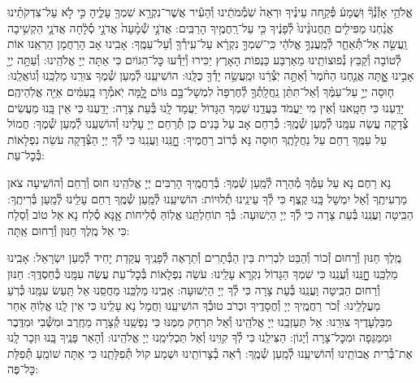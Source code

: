 \documentclass[twoside, openany, parskip=half, 11pt]{book}
\begin{document}
אֱלֹהַ֥י אָזְ֯נְ֯ךָ֘ וּֽשֲׁמָע֒ פְּ֯קַ֣חה עֵינֶ֗יךָ וּרְאֵה֙ שֹֽׁמְ֯מֹתֵ֔ינוּ וְ֯הָעִ֕יר אֲשֶׁר־נִקְרָ֥א שִׁמְךָ֖ עָלֶ֑יהָ כִּ֣י לֹ֣א עַל־צִדְקֹתֵ֗ינוּ אֲנַ֨חְנוּ מַפִּילִ֤ים תַּֽחֲנוּנֵ֨ינוּ֙ לְ֯פָנֶ֔יךָ כִּ֖י עַל־רַֽחֲמֶ֥יךָ הָרַבִּֽים: אֲדֹנָ֤י שְׁ֯מָ֨עָה֙ אֲדֹנָ֣י סְ֯לָ֔חָה אֲדֹנָ֛י הַקְשִׁ֥יבָה וַֽעֲשֵׂ֖ה אַל־תְּ֯אַחַ֑ר לְ֯מַֽעֲנְךָ֣ אֱלֹהַ֔י כִּֽי־שִׁמְךָ֣ נִקְרָ֔א עַל־עִֽירְ֯ךָ֖ וְ֯עַל־עַמֶּֽךָ: אָבִֽינוּ אָב הָרַחֲמָן הַרְאֵֽנוּ אוֹת לְ֯טוֹבָה וְ֯קַבֵּץ נְ֯פוּצוֹתֵֽינוּ מֵאַרְבַּע כַּנְפוֹת הָאָרֶץ יַכִּירוּ וְ֯יֵדְ֯עוּ כׇּל־הַגּוֹיִם כִּי אַתָּה יְיָ אֱלֹהֵֽינוּ:
וְ֯עַתָּ֥ה יְיָ֖ אָבִ֣ינוּ אׇׇׇֽתָּה אֲנַ֤חְנוּ הַחֹ֨מֶר֙ וְ֯אַתָּ֣ה יֹֽצְ֯רֵ֔נוּ וּמַֽעֲשֵׂ֥ה יָדְ֯ךָ֖ כֻּלָּֽנוּ: הוֹשִׁיעֵֽנוּ לְ֯מַעַן שְׁ֯מֶךָ צוּרֵֽנוּ מַלְכֵּֽנוּ וְ֯גוֹאֲלֵֽנוּ:
ח֧וּסָה יְיָ֣ עַל־עַמֶּ֗ךָ וְ֯אַל־תִּתֵּ֨ן נַֽחֲלָֽתְ֯ךָ֤ לְ֯חֶרְפָּה֙ לִמְשָׁל־בָּ֣ם גּוֹיִ֔ם לׇׇ֚מָּה יֹֽאמְ֯ר֣וּ בָֽעַמִּ֔ים אַיֵּ֖ה אֱלֹֽהֵיהֶֽם׃ יָדַֽעְנוּ כִּי חָטָֽאנוּ וְ֯אֵין מִי יַעֲמֹד בַּעֲדֵֽנוּ שִׁמְךָ הַגָּדוֹל יַעֲמָד לָֽנוּ בְּ֯עֵת צָרָה: יָדַֽעְנוּ כִּי אֵין בָּֽנוּ מַעֲשִׂים צְ֯דָקָה עֲשֵׂה עִמָּֽנוּ לְ֯מַעַן שְׁ֯מֶֽךָ: כְּ֯רַחֵם אָב עַל בָּנִים כֵּן תְּ֯רַחֵם יְיָ עָלֵינוּ וְ֯הוֹשִׁעֵֽנוּ לְ֯מַעַן שְׁ֯מֶךָ: חֲמוֹל עַל עַמֶּֽךָ רַחֵם עַל נַחֲלָתֶֽךָ חֽוּסָה נָּא כְּ֯רוֹב רַחֲמֶיךָ: חׇׇׇׇנֵּֽנוּ וַעֲנֵֽנוּ כִּי לְ֯ךָ יְיָ הַצְּ֯דָקָה עֹשֵׂה נִפְלָאוֹת בְּ֯כׇל־עֵת:



נָא רַחֶם נָא עַל עַמְּ֯ךָ מְ֯הֵרָה לְ֯מַֽעַן שְׁ֯מֶךָ: בְּ֯רַחֲמֶֽיךָ הָרַבִּים יְיָ אֱלֹהֵֽינוּ חוּס וְ֯רַחֵם וְ֯הוֹשִֽׁיעָה צֹאן מַרְעִיתֶֽךָ וְ֯אַל יִמְשָׁל בָּֽנוּ קֶֽצֶף כִּי לְ֯ךָ עֵינֵֽינוּ תְ֯לוּיוֹת: הוֹשִׁיעֵֽנוּ לְ֯מַֽעַן שְׁ֯מֶֽךָ רַחֵם עָלֵֽינוּ לְ֯מַֽעַן בְּ֯רִיתֶֽךָ: הַבִּֽיטָה וַעֲנֵֽנוּ בְּ֯עֵת צָרָה כִּי לְ֯ךָ יְיָ הַיְשׁוּעָה: בְּ֯ךָ תוֹחַלְתֵּֽנוּ אֱלֽוֹהַּ סְ֯לִיחוֹת אׇׇנָּא סְ֯לַח נָא אֵל טוֹב וְ֯סַלָח כִּי אֵל מֶֽלֶךְ חַנּוּן וְ֯רַחוּם אַֽתָּה:

מֶֽלֶךְ חַנּוּן וְ֯רַחוּם זְ֯כוֹר וְ֯הַבֵּט לִבְרִית בֵּין הַבְּ֯תָרִים וְ֯תֵרָאֶה לְ֯פָנֶֽיךָ עֲקֵדַת יָחִיד לְ֯מַעַן יִשְׂרָאֵל: אָבִֽינוּ מַלְכֵּֽנוּ חׇׇׇׇנֵּֽנוּ וְ֯עֲנֵֽנוּ כִּי שִׁמְךָ הַגָּדוֹל נִקְרָא עָלֵֽינוּ: עֹשֵׂה נִפְלָאוֹת בְּ֯כׇל־עֵת עֲשֵׂה עִמָּֽנוּ כְּ֯חַסְדֶּֽךָ: חַנּוּן וְ֯רַחוּם הַבִּֽיטָה וַעֲנֵֽנוּ בְּ֯עֵת צָרָה כִּי לְ֯ךָ יְיָ הַיְשׁוּעָה: אָבִֽינוּ מַלְכֵּֽנוּ מַחֲסֵֽנוּ אַל תַּֽעַשׂ עִמָּֽנוּ כְּ֯רֹֽעַ מַעֲלָלֵֽינוּ: זְ֯כֹר רַחֲמֶֽיךָ יְיָ וְ֯חֲסָדֶֽיךָ וּכְרֹב טוּבְ֯ךָ הוֹשִׁיעֵֽנוּ וַחֲמָל נָא עָלֵֽינוּ כִּי אֵין לָֽנוּ אֱלֽוֹהַּ אַחֵר מִבַּלְעָדֶיךָ צוּרֵֽנוּ: אַל תַּעַזְבֵֽנוּ יְיָ אֱלֹהֵֽינוּ וְ֯אַל תִּרְחַק מִמֶּנּוּ כִּי נַפְשֵֽׁנוּ קְ֯צָרָה מֵחֶֽרֶב וּמִשְּׁ֯בִי וּמִדֶּֽבֶר וּמִמַּגֵּפָה וּמִכׇּל־צָרָה וְ֯יָגוֹן: הַצִּילֵֽנוּ כִּי לְ֯ךָ קִוִּֽינוּ וְ֯אַל תַּכְלִימֵֽנוּ יְיָ אֱלֹהֵֽינוּ: וְ֯הָאֵר פָּנֶֽיךָ בָּֽנוּ וּזְכָר לָֽנוּ אֶת־בְּ֯רִית אֲבוֹתֵֽינוּ וְ֯הוֹשִׁיעֵֽנוּ לְ֯מַֽעַן שְׁ֯מֶֽךָ: רְ֯אֵה בְ֯צָרוֹתֵֽינוּ וּשְׁמַע קוֹל תְּ֯פִלָּתֵֽנוּ כִּי אַתָּה שׁוֹמֵֽעַ תְּ֯פִלַּת כׇּל־פֶּה:
\end{document}
